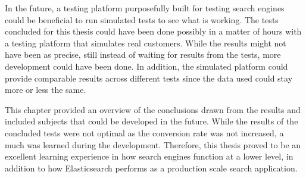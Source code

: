 In the future, a testing platform purposefully built for testing search engines could be beneficial 
to run simulated tests to see what is working.
The tests concluded for this thesis could have been done possibly in a matter of hours with a testing platform
that simulates real customers.
While the results might not have been as precise, still instead of waiting for results from the tests,
more development could have been done.
In addition, the simulated platform could provide comparable results across different tests since the data used
could stay more or less the same.





This chapter provided an overview of the conclusions drawn from the results and included subjects that could be
developed in the future.
While the results of the concluded tests were not optimal as the conversion rate was not increased,
a much was learned during the development.
Therefore, this thesis proved to be an excellent learning experience in how search engines function at a lower level, 
in addition to how Elasticsearch performs as a production scale search application.


